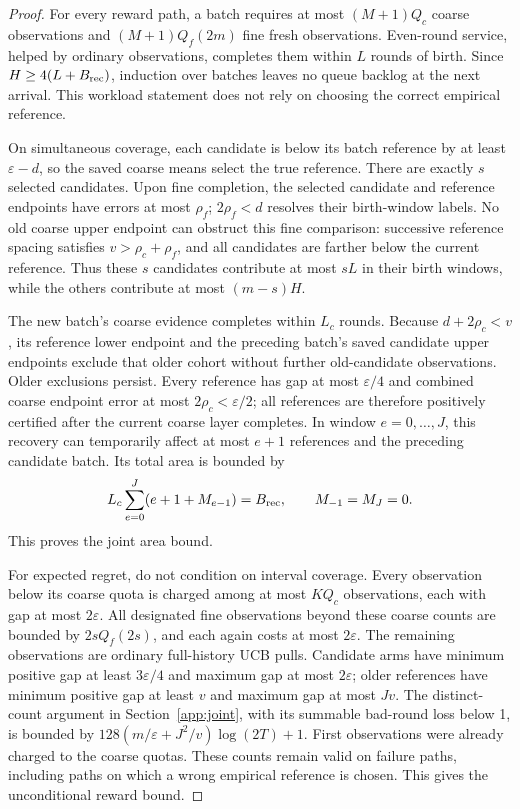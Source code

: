 \documentclass[11pt]{article}
\theoremstyle{remark}
\begin{document}
\begin{proof}
For every reward path, a batch requires at most $(M+1)Q_c$ coarse
observations and $(M+1)Q_f(2m)$ fine fresh observations. Even-round
service, helped by ordinary observations, completes them within $L$
rounds of birth. Since $H\ge4(L+B_{\rm rec})$, induction over batches
leaves no queue backlog at the next arrival. This workload statement
does not rely on choosing the correct empirical reference.

On simultaneous coverage, each candidate is below its batch reference
by at least $\varepsilon-d$, so the saved coarse means select the true
reference. There are exactly $s$ selected candidates. Upon fine
completion, the selected candidate and reference endpoints have errors
at most $\rho_f$; $2\rho_f<d$ resolves their birth-window labels.
No old coarse upper endpoint can obstruct this fine comparison:
successive reference spacing satisfies $v>\rho_c+\rho_f$, and all
candidates are farther below the current reference. Thus these $s$
candidates contribute at most $sL$ in their birth windows, while the
others contribute at most $(m-s)H$.

The new batch's coarse evidence completes within $L_c$ rounds.
Because $d+2\rho_c<v$, its reference lower endpoint and the preceding
batch's saved candidate upper endpoints exclude that older cohort
without further old-candidate observations. Older exclusions persist.
Every reference has gap at most $\varepsilon/4$ and combined coarse
endpoint error at most $2\rho_c<\varepsilon/2$; all references are
therefore positively certified after the current coarse layer
completes. In window $e=0,\ldots,J$, this recovery can temporarily
affect at most $e+1$ references and the preceding candidate batch.
Its total area is bounded by
\[
 L_c\sum_{e=0}^J(e+1+M_{e-1})=B_{\rm rec},
 \qquad M_{-1}=M_J=0.
\]
This proves the joint area bound.

For expected regret, do not condition on interval coverage. Every
observation below its coarse quota is charged among at most $KQ_c$
observations, each with gap at most $2\varepsilon$. All designated
fine observations beyond these coarse counts are bounded by
$2sQ_f(2s)$, and each again costs at most $2\varepsilon$.
The remaining observations are ordinary full-history UCB pulls.
Candidate arms have minimum positive gap at least $3\varepsilon/4$
and maximum gap at most $2\varepsilon$; older references have minimum
positive gap at least $v$ and maximum gap at most $Jv$.
The distinct-count argument in Section~\ref{app:joint}, with its
summable bad-round loss below 1, is bounded by
$128(m/\varepsilon+J^2/v)\log(2T)+1$. First observations were already
charged to the coarse quotas. These counts remain valid on failure
paths, including paths on which a wrong empirical reference is chosen.
This gives the unconditional reward bound.
\end{proof}
\end{document}

